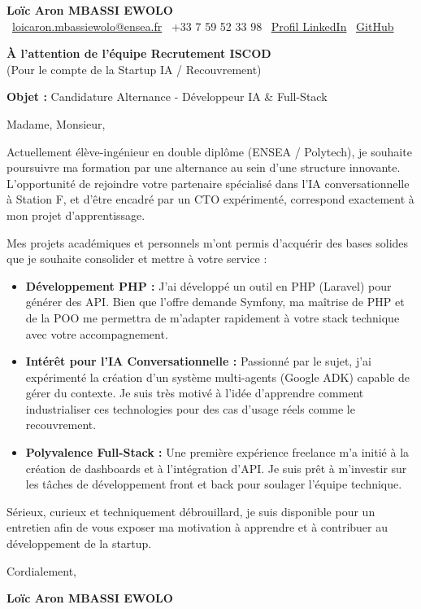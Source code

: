 \documentclass[11pt,a4paper]{article}
\begin{document}
\begin{center}
    {\Large \textbf{Loïc Aron MBASSI EWOLO}} \\
    \vspace{0.2cm}
    \small
    \faEnvelope\ \href{mailto:loicaron.mbassiewolo@ensea.fr}{loicaron.mbassiewolo@ensea.fr} \quad
    \faPhone\ +33 7 59 52 33 98 \quad
    \faLinkedin\ \href{https://www.linkedin.com/in/loic-aron-mbassi-ewolo-3942a9246/}{Profil LinkedIn} \quad
    \faGithub\ \href{https://github.com/Nameless0l}{GitHub}
\end{center}

\vspace{0.5cm}

\hfill \textbf{À l'attention de l'équipe Recrutement ISCOD} \\
\hfill (Pour le compte de la Startup IA / Recouvrement)

\vspace{0.5cm}

\textbf{Objet :} Candidature Alternance - Développeur IA \& Full-Stack

Madame, Monsieur,

Actuellement élève-ingénieur en double diplôme (ENSEA / Polytech), je souhaite poursuivre ma formation par une alternance au sein d'une structure innovante. L'opportunité de rejoindre votre partenaire spécialisé dans l'IA conversationnelle à Station F, et d'être encadré par un CTO expérimenté, correspond exactement à mon projet d'apprentissage.

Mes projets académiques et personnels m'ont permis d'acquérir des bases solides que je souhaite consolider et mettre à votre service :

\begin{itemize}
    \item \textbf{Développement PHP :} J'ai développé un outil en PHP (Laravel) pour générer des API. Bien que l'offre demande Symfony, ma maîtrise de PHP et de la POO me permettra de m'adapter rapidement à votre stack technique avec votre accompagnement.
    
    \item \textbf{Intérêt pour l'IA Conversationnelle :} Passionné par le sujet, j'ai expérimenté la création d'un système multi-agents (Google ADK) capable de gérer du contexte. Je suis très motivé à l'idée d'apprendre comment industrialiser ces technologies pour des cas d'usage réels comme le recouvrement.
    
    \item \textbf{Polyvalence Full-Stack :} Une première expérience freelance m'a initié à la création de dashboards et à l'intégration d'API. Je suis prêt à m'investir sur les tâches de développement front et back pour soulager l'équipe technique.
\end{itemize}

Sérieux, curieux et techniquement débrouillard, je suis disponible pour un entretien afin de vous exposer ma motivation à apprendre et à contribuer au développement de la startup.

Cordialement,

\vspace{0.5cm}

\textbf{Loïc Aron MBASSI EWOLO}
\end{document}
